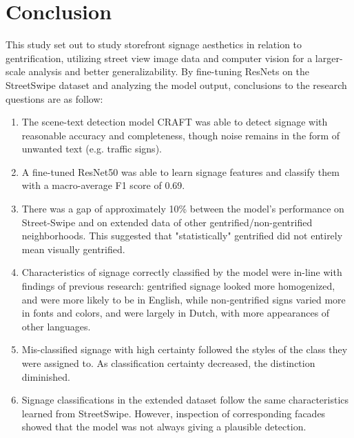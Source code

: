\section{Conclusion}
\label{sec:conclusion}

This study set out to study storefront signage aesthetics in relation to gentrification, utilizing street view image data and computer vision for a larger-scale analysis and better generalizability. By fine-tuning ResNets on 
the StreetSwipe dataset and analyzing the model output, conclusions to the research questions are as follow:

\begin{enumerate}
    \item The scene-text detection model CRAFT was able to detect signage with reasonable accuracy and completeness, though noise remains in the form of unwanted text (e.g. traffic signs).
    
    \item A fine-tuned ResNet50 was able to learn signage features and classify them with a macro-average F1 score of 0.69.
    
    \item There was a gap of approximately 10\% between the model's performance on Street-Swipe and on extended data of other gentrified/non-gentrified neighborhoods. This suggested that "statistically" gentrified did not entirely mean visually gentrified. 
    
    \item Characteristics of signage correctly classified by the model were in-line with findings of previous research: gentrified signage looked more homogenized, and were more likely to be in English, while non-gentrified signs varied more in fonts and colors, and were largely in Dutch, with more appearances of other languages.
    
    \item Mis-classified signage with high certainty followed the styles of the class they were assigned to. As classification certainty decreased, the distinction diminished.
    
    \item Signage classifications in the extended dataset follow the same characteristics learned from StreetSwipe. However, inspection of corresponding facades showed that the model was not always giving a plausible detection.
\end{enumerate}

